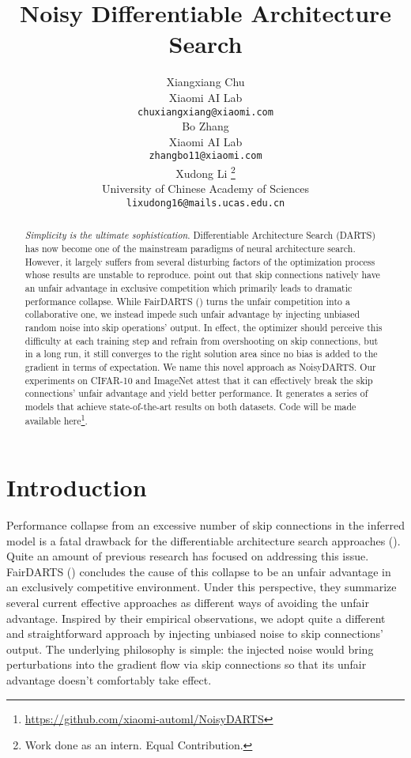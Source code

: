 \documentclass{article}
\title{Noisy Differentiable Architecture Search}
\author{
Xiangxiang Chu \\
Xiaomi AI Lab \\
\texttt{chuxiangxiang@xiaomi.com}\\
\And
Bo Zhang  \\
Xiaomi AI Lab \\
\texttt{zhangbo11@xiaomi.com}\\
\And
Xudong Li \thanks{Work done as an intern. Equal Contribution.} \\
University of Chinese Academy of Sciences\\
\texttt{lixudong16@mails.ucas.edu.cn}
}
\newcommand{\citec}[1]{(\cite{#1})}
\begin{document}
\maketitle

\begin{abstract}
  \emph{Simplicity is the ultimate sophistication}. Differentiable Architecture Search (DARTS) has now become one of the mainstream paradigms of neural architecture search. However, it largely suffers from several disturbing factors of the optimization process whose results are unstable to reproduce. \cite{chu2019fair} point out that skip connections natively have an unfair advantage in exclusive competition which primarily leads to dramatic performance collapse. While FairDARTS \citec{chu2019fair} turns the unfair competition into a collaborative one, we instead impede such unfair advantage by injecting unbiased random noise into skip operations' output. In effect, the optimizer should perceive this difficulty at each training step and refrain from overshooting on skip connections, but in a long run, it still converges to the right solution area since no bias is added to the gradient in terms of expectation. We name this novel approach as NoisyDARTS.
Our experiments on CIFAR-10 and ImageNet attest that it can effectively break the skip connections' unfair advantage and yield better performance. It generates a series of models that achieve state-of-the-art results on both datasets. Code will be made available here\footnote{\url{https://github.com/xiaomi-automl/NoisyDARTS}}.
\end{abstract}

\section{Introduction}
Performance collapse from an excessive number of skip connections in the inferred model is a  fatal drawback for the differentiable architecture search approaches \citec{liu2018darts,chen2019progressive,zela2020understanding,chu2019fair}. Quite an amount of previous research has focused on addressing this issue. FairDARTS \citec{chu2019fair} concludes the cause of this collapse to be an unfair advantage in an exclusively competitive environment. Under this perspective, they summarize several current effective approaches as different ways of avoiding the unfair advantage.  Inspired by their empirical observations, we adopt quite a different and straightforward approach by injecting unbiased noise to skip connections' output. The underlying philosophy is simple:  the injected noise would bring perturbations into the gradient flow via skip connections so that its unfair advantage doesn't comfortably take effect.
\end{document}
